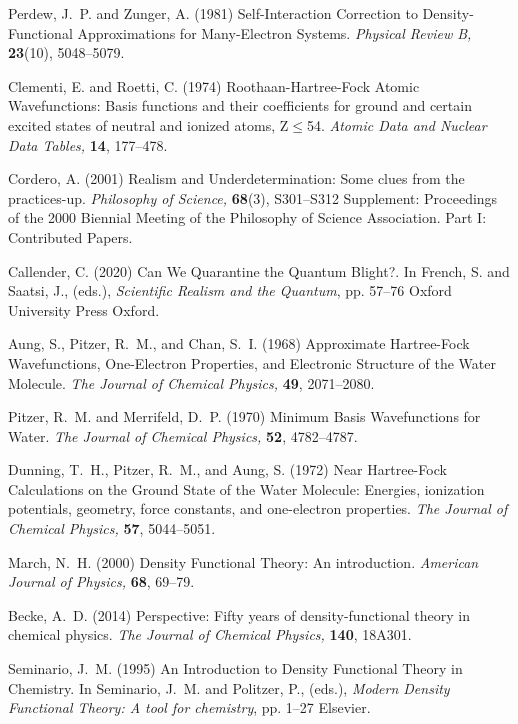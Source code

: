 \documentclass[12pt,onecolumn,secnumarabic,amsmath,amssymb,balancelastpage,nofootinbib]{article}
\begin{document}
\begin{thebibliography}{100}
Perdew, J.~P. and Zunger, A. (1981)
Self-Interaction Correction to Density-Functional Approximations for
  Many-Electron Systems.
{\em Physical Review B,} {\bf 23}(10), 5048--5079.

Clementi, E. and Roetti, C. (1974)
Roothaan-Hartree-Fock Atomic Wavefunctions: Basis functions and their
  coefficients for ground and certain excited states of neutral and ionized
  atoms, Z$\leq$54.
{\em Atomic Data and Nuclear Data Tables,} {\bf 14}, 177--478.

Cordero, A. (2001)
Realism and Underdetermination: Some clues from the practices-up.
{\em Philosophy of Science,} {\bf 68}(3), S301--S312
Supplement: Proceedings of the 2000 Biennial Meeting of the Philosophy of
  Science Association. Part I: Contributed Papers.

Callender, C. (2020)
Can We Quarantine the Quantum Blight?.
In French, S. and Saatsi, J., (eds.), \emph{Scientific Realism and the
  Quantum},  pp. 57--76 Oxford University Press Oxford.

Aung, S., Pitzer, R.~M., and Chan, S.~I. (1968)
Approximate Hartree-Fock Wavefunctions, One-Electron Properties, and Electronic
  Structure of the Water Molecule.
{\em The Journal of Chemical Physics,} {\bf 49}, 2071--2080.

Pitzer, R.~M. and Merrifeld, D.~P. (1970)
Minimum Basis Wavefunctions for Water.
{\em The Journal of Chemical Physics,} {\bf 52}, 4782--4787.

Dunning, T.~H., Pitzer, R.~M., and Aung, S. (1972)
Near Hartree-Fock Calculations on the Ground State of the Water Molecule:
  Energies, ionization potentials, geometry, force constants, and one-electron
  properties.
{\em The Journal of Chemical Physics,} {\bf 57}, 5044--5051.

March, N.~H. (2000)
Density Functional Theory: An introduction.
{\em American Journal of Physics,} {\bf 68}, 69--79.

Becke, A.~D. (2014)
Perspective: Fifty years of density-functional theory in chemical physics.
{\em The Journal of Chemical Physics,} {\bf 140}, 18A301.

Seminario, J.~M. (1995)
An Introduction to Density Functional Theory in Chemistry.
In Seminario, J.~M. and Politzer, P., (eds.), \emph{Modern Density Functional
  Theory: A tool for chemistry},  pp. 1--27 Elsevier.


\end{thebibliography}
\end{document}
